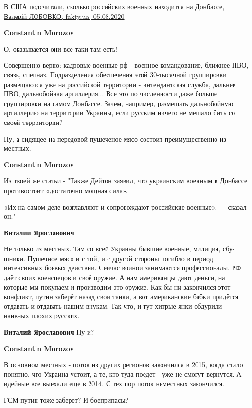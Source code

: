 \begin{itemize}
\begin{itemize}
\href{https://ukrainenews.fakty.ua/352080-v-ssha-podschitali-skolko-rossijskih-voennyh-nahoditsya-na-donbasse}{%
В США подсчитали, сколько российских военных находится на Донбассе, Валерій ЛОБОВКО, fakty.ua, 05.08.2020%
}

\textbf{Constantin Morozov} 

О, оказывается они все-таки там есть!

Совершенно верно: кадровые военные рф - военное командование, ближнее ПВО,
связь, спецназ. Подразделения обеспечения этой 30-тысячной группировки
размещаются уже на российской территории - интендантская служба, дальнее ПВО,
дальнобойная артиллерия... Все это по численности даже больше группировки на
самом Донбассе. Зачем, например, размещать дальнобойную артиллерию на
территории Украины, если русским ничего не мешало бить со своей террритории?

Ну, а сидящее на передовой пушеченое мясо состоит преимущественно из местных.


\textbf{Constantin Morozov} 

Из твоей же статьи - "Также Дейтон заявил, что украинским военным в Донбассе
противостоит «достаточно мощная сила».

«Их на самом деле возглавляют и сопровождают российские военные», — сказал он."

\textbf{Виталий Ярославович} 

Не только из местных. Там со всей Украины бывшие военные, милиция, сбу-шники.
Пушечное мясо и с той, и с другой стороны погибло в период интенсивных боевых
действий. Сейчас войной занимаются профессионалы. РФ даёт своих военспецов и
своё оружие. А нам американцы дают деньги, на которые мы покупаем и производим
это оружие. Как бы ни закончился этот конфликт, путин заберёт назад свои танки,
а вот американские бабки придётся отдавать и отдавать нашим внукам. Так что, и
тут хитрые янки обдурили наивных плохих русских.


\textbf{Виталий Ярославович} Ну и?

\textbf{Constantin Morozov} 

В основном местных - поток из других регионов закончился в 2015, когда стало
понятно, что Украина устоит, а те, кто туда поедет - уже не смогут вернутся. А
идейные все выехали еще в 2014. С тех пор поток неместных закончился.

ГСМ путин тоже заберет? И боеприпасы?


\end{itemize}
\end{itemize}
